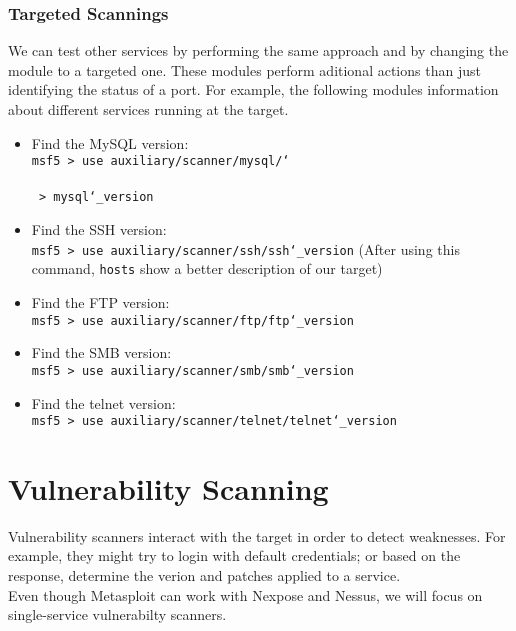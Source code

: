 \documentclass[twocolumn]{article}
\begin{document}
\subsubsection{Targeted Scannings}
We can test other services by performing the same approach and by changing the module to a targeted one. These modules perform aditional actions than just identifying the status of a port. For example, the following modules information about different services running at the target.

\begin{itemize}
    \setlength\itemsep{-0.25em}
    \item Find the MySQL version:\\
    \noindent\texttt{msf5 > use auxiliary/scanner/mysql/\char`\\}\\
    \hspace*{2.25pt}\texttt{ > mysql\char`\_version}
    \item Find the SSH version:\\
    \noindent\texttt{msf5 > use auxiliary/scanner/ssh/ssh\char`\_version} (After using this command, \texttt{hosts} show a better description of our target)
    \item Find the FTP version:\\
    \noindent\texttt{msf5 > use auxiliary/scanner/ftp/ftp\char`\_version}
    \item Find the SMB version:\\
    \noindent\texttt{msf5 > use auxiliary/scanner/smb/smb\char`\_version}
    \item Find the telnet version:\\
    \noindent\texttt{msf5 > use auxiliary/scanner/telnet/telnet\char`\_version}
\end{itemize}

\section{Vulnerability Scanning}

Vulnerability scanners interact with the target in order to detect weaknesses. For example, they might try to login with default credentials; or based on the response, determine the verion and patches applied to a service.\\

\noindent Even though Metasploit can work with Nexpose and Nessus, we will focus on single-service vulnerabilty scanners.
\end{document}
